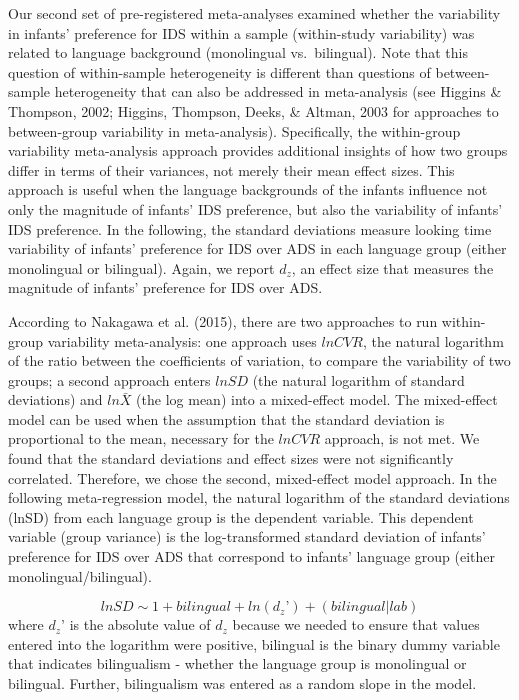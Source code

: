 \documentclass[,man,floatsintext]{apa6}
\begin{document}
Our second set of pre-registered meta-analyses examined whether the variability in infants' preference for IDS within a sample (within-study variability) was related to language background (monolingual vs.~bilingual). Note that this question of within-sample heterogeneity is different than questions of between-sample heterogeneity that can also be addressed in meta-analysis (see Higgins \& Thompson, 2002; Higgins, Thompson, Deeks, \& Altman, 2003 for approaches to between-group variability in meta-analysis). Specifically, the within-group variability meta-analysis approach provides additional insights of how two groups differ in terms of their variances, not merely their mean effect sizes. This approach is useful when the language backgrounds of the infants influence not only the magnitude of infants' IDS preference, but also the variability of infants' IDS preference. In the following, the standard deviations measure looking time variability of infants' preference for IDS over ADS in each language group (either monolingual or bilingual). Again, we report \(d_z\), an effect size that measures the magnitude of infants' preference for IDS over ADS.

According to Nakagawa et al. (2015), there are two approaches to run within-group variability meta-analysis: one approach uses \(lnCVR\), the natural logarithm of the ratio between the coefficients of variation, to compare the variability of two groups; a second approach enters \(lnSD\) (the natural logarithm of standard deviations) and \(ln\bar{X}\) (the log mean) into a mixed-effect model. The mixed-effect model can be used when the assumption that the standard deviation is proportional to the mean, necessary for the \(lnCVR\) approach, is not met. We found that the standard deviations and effect sizes were not significantly correlated. Therefore, we chose the second, mixed-effect model approach. In the following meta-regression model, the natural logarithm of the standard deviations (lnSD) from each language group is the dependent variable. This dependent variable (group variance) is the log-transformed standard deviation of infants' preference for IDS over ADS that correspond to infants' language group (either monolingual/bilingual).

\[lnSD \sim 1 + bilingual + ln(d_z’) + (bilingual | lab)\]
where \(d_z’\) is the absolute value of \(d_z\) because we needed to ensure that values entered into the logarithm were positive, bilingual is the binary dummy variable that indicates bilingualism - whether the language group is monolingual or bilingual. Further, bilingualism was entered as a random slope in the model.
\end{document}
